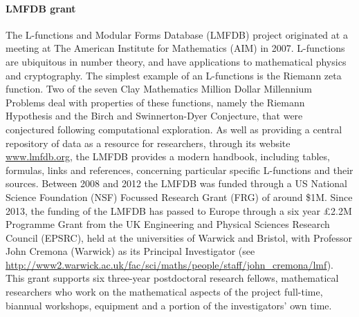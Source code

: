 \documentclass[a4paper,11pt]{article}
\begin{document}
\paragraph{LMFDB grant}

The L-functions and Modular Forms Database (LMFDB) project originated
at a meeting at The American Institute for Mathematics (AIM) in 2007.
L-functions are ubiquitous in number theory, and have applications to
mathematical physics and cryptography. The simplest example of an
L-functions is the Riemann zeta function. Two of the seven Clay
Mathematics Million Dollar Millennium Problems deal with properties of
these functions, namely the Riemann Hypothesis and the Birch and
Swinnerton-Dyer Conjecture, that were conjectured following computational exploration.  
As well as providing a central repository
of data as a resource for researchers, through its website
\url{www.lmfdb.org}, the LMFDB provides a modern handbook, including
tables, formulas, links and references, concerning particular specific
L-functions and their sources.  Between 2008 and 2012 the LMFDB was
funded through a US National Science Foundation (NSF) Focussed
Research Grant (FRG) of around \$1M.  Since 2013, the funding of the
LMFDB has passed to Europe through a six year £2.2M Programme Grant
from the UK Engineering and Physical Sciences Research Council
(EPSRC), held at the universities of Warwick and Bristol, with
Professor John Cremona (Warwick) as its Principal Investigator (see
\url{http://www2.warwick.ac.uk/fac/sci/maths/people/staff/john_cremona/lmf}).
This grant supports six three-year postdoctoral research fellows,
mathematical researchers who work on the mathematical aspects of the
project full-time, biannual workshops, equipment and a portion of the
investigators' own time.
\end{document}
